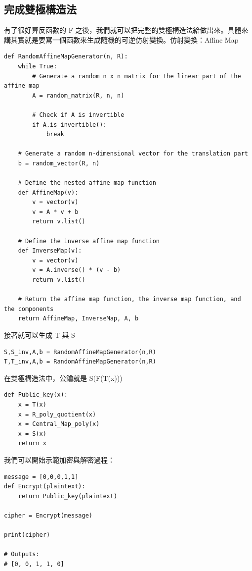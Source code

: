 \documentclass[
]{article}
\begin{document}
\hypertarget{ux5b8cux6210ux96d9ux6975ux69cbux9020ux6cd5}{%
\subsection{完成雙極構造法}\label{ux5b8cux6210ux96d9ux6975ux69cbux9020ux6cd5}}

有了很好算反函數的 F
之後，我們就可以把完整的雙極構造法給做出來。具體來講其實就是要寫一個函數來生成隨機的可逆仿射變換。仿射變換：Affine
Map

\begin{verbatim}
def RandomAffineMapGenerator(n, R):
    while True:
        # Generate a random n x n matrix for the linear part of the affine map
        A = random_matrix(R, n, n)

        # Check if A is invertible
        if A.is_invertible():
            break

    # Generate a random n-dimensional vector for the translation part
    b = random_vector(R, n)

    # Define the nested affine map function
    def AffineMap(v):
        v = vector(v)
        v = A * v + b
        return v.list()

    # Define the inverse affine map function
    def InverseMap(v):
        v = vector(v)
        v = A.inverse() * (v - b)
        return v.list()

    # Return the affine map function, the inverse map function, and the components
    return AffineMap, InverseMap, A, b
\end{verbatim}

接著就可以生成 T 與 S

\begin{verbatim}
S,S_inv,A,b = RandomAffineMapGenerator(n,R)
T,T_inv,A,b = RandomAffineMapGenerator(n,R)
\end{verbatim}

在雙極構造法中，公鑰就是 S(F(T(x)))

\begin{verbatim}
def Public_key(x):
    x = T(x)
    x = R_poly_quotient(x)
    x = Central_Map_poly(x)
    x = S(x)
    return x
\end{verbatim}

我們可以開始示範加密與解密過程：

\begin{verbatim}
message = [0,0,0,1,1]
def Encrypt(plaintext):
    return Public_key(plaintext)

cipher = Encrypt(message)

print(cipher)

# Outputs:
# [0, 0, 1, 1, 0]
\end{verbatim}
\end{document}
